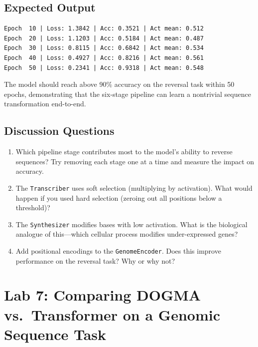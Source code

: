 \subsection{Expected Output}

\begin{lstlisting}[style=dogmapython, caption={Lab 6: Expected training output.}, numbers=none]
Epoch  10 | Loss: 1.3842 | Acc: 0.3521 | Act mean: 0.512
Epoch  20 | Loss: 1.1203 | Acc: 0.5184 | Act mean: 0.487
Epoch  30 | Loss: 0.8115 | Acc: 0.6842 | Act mean: 0.534
Epoch  40 | Loss: 0.4927 | Acc: 0.8216 | Act mean: 0.561
Epoch  50 | Loss: 0.2341 | Acc: 0.9318 | Act mean: 0.548
\end{lstlisting}

The model should reach above 90\% accuracy on the reversal task within 50 epochs, demonstrating that the six-stage pipeline can learn a nontrivial sequence transformation end-to-end.

\subsection{Discussion Questions}

\begin{enumerate}[leftmargin=1.8em]
  \item Which pipeline stage contributes most to the model's ability to reverse sequences? Try removing each stage one at a time and measure the impact on accuracy.
  \item The \texttt{Transcriber} uses soft selection (multiplying by activation). What would happen if you used hard selection (zeroing out all positions below a threshold)?
  \item The \texttt{Synthesizer} modifies bases with low activation. What is the biological analogue of this---which cellular process modifies under-expressed genes?
  \item Add positional encodings to the \texttt{GenomeEncoder}. Does this improve performance on the reversal task? Why or why not?
\end{enumerate}


\section{Lab 7: Comparing DOGMA vs.\ Transformer on a Genomic Sequence Task}
\label{sec:lab7-comparison}

